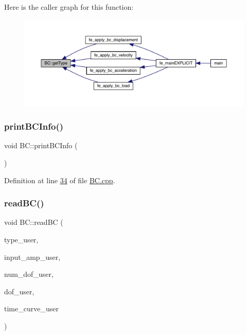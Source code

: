 Here is the caller graph for this function\+:\nopagebreak
\begin{figure}[H]
\begin{center}
\leavevmode
\includegraphics[width=350pt]{class_b_c_aa6afb3d4586f395578bef89c77e60449_icgraph}
\end{center}
\end{figure}
\mbox{\label{class_b_c_a7f2fb6f9d3848e8f0617902b3fb804af}} 
\subsubsection{\texorpdfstring{print\+B\+C\+Info()}{printBCInfo()}}
{\footnotesize\ttfamily void B\+C\+::print\+B\+C\+Info (\begin{DoxyParamCaption}{ }\end{DoxyParamCaption})}



Definition at line \hyperlink{_b_c_8cpp_source_l00034}{34} of file \hyperlink{_b_c_8cpp_source}{B\+C.\+cpp}.

\mbox{\label{class_b_c_a8ceaa781f98b4128fa50611ff9481e1a}} 
\subsubsection{\texorpdfstring{read\+B\+C()}{readBC()}}
{\footnotesize\ttfamily void B\+C\+::read\+BC (\begin{DoxyParamCaption}\item[{std\+::string}]{type\+\_\+user,  }\item[{double}]{input\+\_\+amp\+\_\+user,  }\item[{int}]{num\+\_\+dof\+\_\+user,  }\item[{Vector\+Xi}]{dof\+\_\+user,  }\item[{std\+::string}]{time\+\_\+curve\+\_\+user }\end{DoxyParamCaption})}




